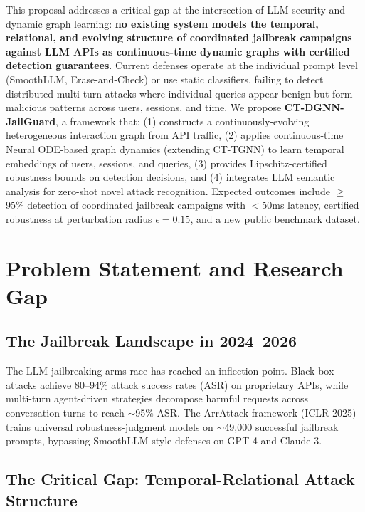 \documentclass[12pt,a4paper]{article}
\begin{document}
This proposal addresses a critical gap at the intersection of LLM security and dynamic graph learning: \textbf{no existing system models the temporal, relational, and evolving structure of coordinated jailbreak campaigns against LLM APIs as continuous-time dynamic graphs with certified detection guarantees}. Current defenses operate at the individual prompt level (SmoothLLM, Erase-and-Check) or use static classifiers, failing to detect distributed multi-turn attacks where individual queries appear benign but form malicious patterns across users, sessions, and time. We propose \textbf{CT-DGNN-JailGuard}, a framework that: (1) constructs a continuously-evolving heterogeneous interaction graph from API traffic, (2) applies continuous-time Neural ODE-based graph dynamics (extending CT-TGNN) to learn temporal embeddings of users, sessions, and queries, (3) provides Lipschitz-certified robustness bounds on detection decisions, and (4) integrates LLM semantic analysis for zero-shot novel attack recognition. Expected outcomes include $\geq$95\% detection of coordinated jailbreak campaigns with $<$50ms latency, certified robustness at perturbation radius $\epsilon=0.15$, and a new public benchmark dataset.

\section{Problem Statement and Research Gap}

\subsection{The Jailbreak Landscape in 2024--2026}

The LLM jailbreaking arms race has reached an inflection point. Black-box attacks achieve 80--94\% attack success rates (ASR) on proprietary APIs, while multi-turn agent-driven strategies decompose harmful requests across conversation turns to reach $\sim$95\% ASR. The ArrAttack framework (ICLR 2025) trains universal robustness-judgment models on $\sim$49,000 successful jailbreak prompts, bypassing SmoothLLM-style defenses on GPT-4 and Claude-3.

\subsection{The Critical Gap: Temporal-Relational Attack Structure}
\end{document}
